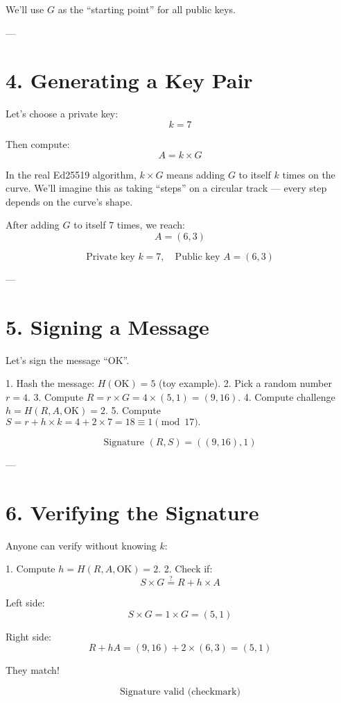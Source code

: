 \documentclass[12pt]{article}
\begin{document}
We’ll use \( G \) as the “starting point” for all public keys.

---

\section*{4. Generating a Key Pair}

Let’s choose a private key:
\[
k = 7
\]

Then compute:
\[
A = k \times G
\]

In the real Ed25519 algorithm, \( k \times G \) means adding \( G \) to itself \( k \) times on the curve.
We’ll imagine this as taking “steps” on a circular track — every step depends on the curve’s shape.

After adding \( G \) to itself 7 times, we reach:
\[
A = (6, 3)
\]

\[
\boxed{\text{Private key } k = 7, \quad \text{Public key } A = (6, 3)}
\]

---

\section*{5. Signing a Message}

Let’s sign the message “OK”.

1. Hash the message: \( H(\text{OK}) = 5 \) (toy example).  
2. Pick a random number \( r = 4 \).  
3. Compute \( R = r \times G = 4 \times (5,1) = (9, 16) \).  
4. Compute challenge \( h = H(R, A, \text{OK}) = 2 \).  
5. Compute \( S = r + h \times k = 4 + 2 \times 7 = 18 \equiv 1 \pmod{17}. \)

\[
\boxed{\text{Signature } (R, S) = ((9, 16), 1)}
\]

---

\section*{6. Verifying the Signature}

Anyone can verify without knowing \( k \):

1. Compute \( h = H(R, A, \text{OK}) = 2 \).  
2. Check if:
\[
S \times G \stackrel{?}{=} R + h \times A
\]

Left side:
\[
S \times G = 1 \times G = (5,1)
\]

Right side:
\[
R + hA = (9,16) + 2 \times (6,3) = (5,1)
\]

They match!

\[
\boxed{\text{Signature valid (checkmark)}}
\]
\end{document}
